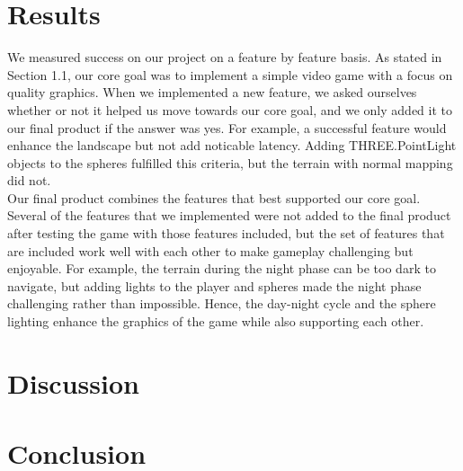\documentclass{article}
\begin{document}
\section{Results}
We measured success on our project on a feature by feature basis.  As stated in Section 1.1, our core goal was to implement a simple video game with a focus on quality graphics.  When we implemented a new feature, we asked ourselves whether or not it helped us move towards our core goal, and we only added it to our final product if the answer was yes.  For example, a successful feature would enhance the landscape but not add noticable latency. Adding THREE.PointLight objects to the spheres fulfilled this criteria, but the terrain with normal mapping did not.\\

Our final product combines the features that best supported our core goal.  Several of the features that we implemented were not added to the final product after testing the game with those features included, but the set of features that are included work well with each other to make gameplay challenging but enjoyable. For example, the terrain during the night phase can be too dark to navigate, but adding lights to the player and spheres made the night phase challenging rather than impossible.  Hence, the day-night cycle and the sphere lighting enhance the graphics of the game while also supporting each other.

%

\section{Discussion}
\section{Conclusion}
\end{document}
